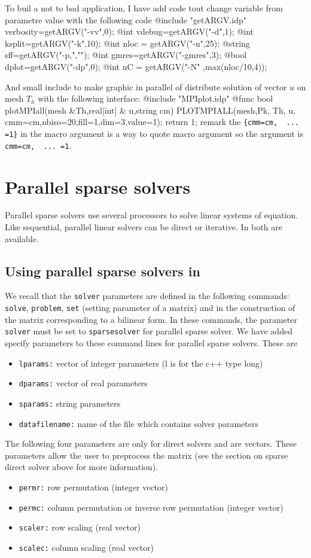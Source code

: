 \documentclass[a4paper,twoside,12pt]{book}
\begin{document}
To buil a not to bad application, I have add code tout change variable from parametre value
with the following code 
\bFF
@include "getARGV.idp"
verbosity=getARGV("-vv",0);
@int vdebug=getARGV("-d",1);
@int ksplit=getARGV("-k",10);
@int nloc = getARGV("-n",25);
@string sff=getARGV("-p,","");
@int gmres=getARGV("-gmres",3); 
@bool dplot=getARGV("-dp",0);
@int nC = getARGV("-N" ,max(nloc/10,4)); 
\eFF

 And  small include to make graphic in parallel
of distribute solution of vector $u$ on mesh $T_h$
with the following interface:
\bFF
@include "MPIplot.idp"
@func bool  plotMPIall(mesh &Th,real[int] & u,string  cm)
{ PLOTMPIALL(mesh,Pk, Th, u,{ cmm=cm,nbiso=20,fill=1,dim=3,value=1}); return 1;}
\eFF
remark the \verb!{cmm=cm,  ... =1}! in the macro argument is a way to quote macro argument 
so the argument is \verb!cmm=cm,  ... =1!.


\section{Parallel sparse solvers}
Parallel sparse solvers use several processors to solve linear systems of equation. Like  sequential,
parallel linear solvers can be direct or iterative. In \freefempp both are available.

\subsection{Using  parallel sparse solvers in \freefempp}
We recall that the \texttt{solver} parameters are defined in the following commands: \texttt{solve}, \texttt{problem}, \texttt{set} (setting parameter  of a matrix)
and in the construction of the matrix corresponding to a bilinear form. In these commands, the parameter \texttt{solver} must be set to \texttt{sparsesolver}
for parallel sparse solver. We have added specify parameters to these command lines for parallel sparse solvers. These are
\begin{itemize}
\item \texttt{lparams:}   vector of integer parameters  (l is for the c++ type long)
\item \texttt{dparams:}  vector of real parameters
\item \texttt{sparams:}  string parameters
\item \texttt{datafilename:}  name of the file which contains solver parameters
\end{itemize}
The following four parameters are only for direct solvers and are vectors. These parameters allow the user to preprocess the matrix
(see the section on sparse direct solver above for more information).
\begin{itemize}
\item \texttt{permr:}   row permutation (integer vector)
\item \texttt{permc:}  column permutation or inverse row permutation  (integer vector)
\item \texttt{scaler:}   row scaling        (real vector)
\item \texttt{scalec:}  column scaling (real vector)
\end{itemize}
\end{document}
